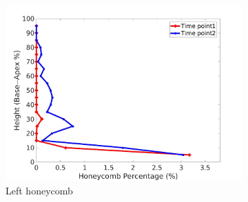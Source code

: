 \begin{figure}[H]
\begin{subfigure}{.42\linewidth}
  \includegraphics[width=\linewidth,trim={{.0\wd0} {.0\wd0} {.0\wd0} {.0\wd0}},clip]{Appendix/Image_AppexA/BaseToApex/IPF13LeftLungHoneycombDiseaseAgainstHeight.jpg} %
  \caption{Left honeycomb}
  \label{fig:IPF13DiseaseAgainstHeight-e} 
\end{subfigure} 
\begin{subfigure}{.42\linewidth}%

\end{subfigure}
\end{figure}
